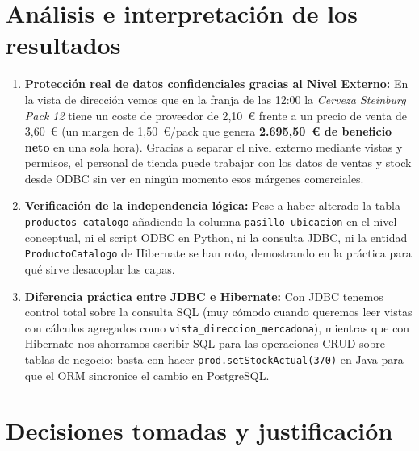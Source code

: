 \documentclass[a4paper,12pt]{article}
\begin{document}
\section{Análisis e interpretación de los resultados}

\begin{enumerate}[leftmargin=1.0cm]
    \item \textbf{Protección real de datos confidenciales gracias al Nivel Externo:} En la vista de dirección vemos que en la franja de las 12:00 la \textit{Cerveza Steinburg Pack 12} tiene un coste de proveedor de 2,10~\euro{} frente a un precio de venta de 3,60~\euro{} (un margen de 1,50~\euro{}/pack que genera \textbf{2.695,50~\euro{} de beneficio neto} en una sola hora). Gracias a separar el nivel externo mediante vistas y permisos, el personal de tienda puede trabajar con los datos de ventas y stock desde ODBC sin ver en ningún momento esos márgenes comerciales.
    \item \textbf{Verificación de la independencia lógica:} Pese a haber alterado la tabla \texttt{productos\_catalogo} añadiendo la columna \texttt{pasillo\_ubicacion} en el nivel conceptual, ni el script ODBC en Python, ni la consulta JDBC, ni la entidad \texttt{ProductoCatalogo} de Hibernate se han roto, demostrando en la práctica para qué sirve desacoplar las capas.
    \item \textbf{Diferencia práctica entre JDBC e Hibernate:} Con JDBC tenemos control total sobre la consulta SQL (muy cómodo cuando queremos leer vistas con cálculos agregados como \texttt{vista\_direccion\_mercadona}), mientras que con Hibernate nos ahorramos escribir SQL para las operaciones CRUD sobre tablas de negocio: basta con hacer \texttt{prod.setStockActual(370)} en Java para que el ORM sincronice el cambio en PostgreSQL.
\end{enumerate}

\section{Decisiones tomadas y justificación}
\end{document}
